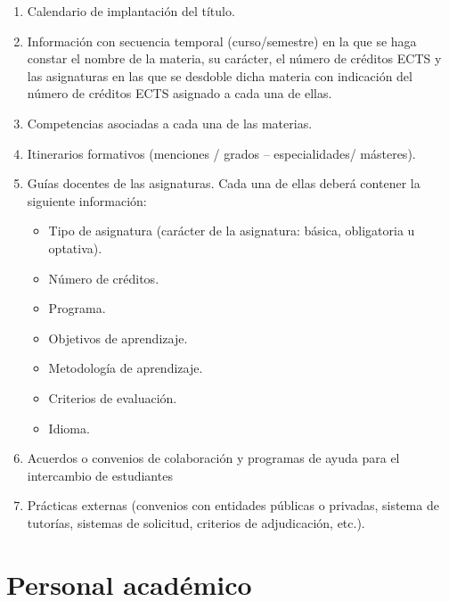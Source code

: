 \begin{enumerate}

    \item Calendario de implantación del título.

    \item Información con secuencia temporal (curso/semestre) en la que se haga
        constar el nombre de la materia, su carácter, el número de créditos ECTS
        y las asignaturas en las que se desdoble dicha materia con indicación del
        número de créditos ECTS asignado a cada una de ellas.

    \item Competencias asociadas a cada una de las materias.

    \item Itinerarios formativos (menciones / grados – especialidades/ másteres).

    \item Guías docentes de las asignaturas. Cada una de ellas deberá contener
        la siguiente información:

        \begin{itemize}

            \item Tipo de asignatura (carácter de la asignatura: básica, obligatoria u optativa).
            \item Número de créditos.
            \item Programa.
            \item Objetivos de aprendizaje.
            \item Metodología de aprendizaje.
            \item Criterios de evaluación.
            \item Idioma.

        \end{itemize}

    \item Acuerdos o convenios de colaboración y programas de ayuda para el
        intercambio de estudiantes

    \item Prácticas externas (convenios con entidades públicas o privadas, sistema
        de tutorías, sistemas de solicitud, criterios de adjudicación, etc.).


\end{enumerate}

\section{Personal académico}

